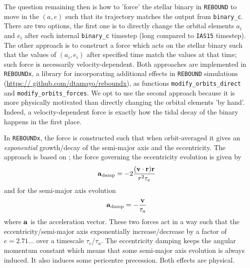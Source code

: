 \documentclass[twoside,openright,titlepage,numbers=noenddot,headinclude,%
                footinclude=true,cleardoublepage=empty,abstractoff, 
                BCOR=5mm,paper=a4,fontsize=11pt,%
                american,%
                ]{scrreprt}%
\begin{document}
The question remaining then is how to 'force' the stellar binary in \texttt{REBOUND}
to move in the $(a,e)$ such that its trajectory matches the output from 
\texttt{binary\_c}. There are two options, the first one is to directly change 
the orbital elements $a_i$ and $e_i$ after each internal \texttt{binary\_c} timestep
(long compared to \texttt{IAS15} timestep). The other approach is to construct 
a force which acts on the stellar binary such that the values of $(a_i,e_i)$ after
specified time match the  values at that time; such force is 
necessarily velocity-dependent. Both approaches
are implemented in \texttt{REBOUNDx}, a library for incorporating additional effects
in \texttt{REBOUND} simulations (\url{https:// github.com/dtamayo/reboundx}), as
functions \texttt{modify\_orbits\_direct} and \texttt{modify\_orbits\_forces}. We opt
to use the second approach because it is more physically motivated than directly 
changing the orbital elements 'by hand'. Indeed, a velocity-dependent force
 is exactly how the tidal decay of the binary happens in the first place.

In \texttt{REBOUNDx}, the force is constructed such that when orbit-averaged it
gives an \emph{exponential} growth/decay of the semi-major axis and the
eccentricity. The approach is based on \citet{papaloizou}; the force governing 
the eccentricity evolution is given by
\begin{equation}
    \boldsymbol{\mathbf{a}}_\text{damp}=-2 \frac{(\boldsymbol{\mathbf{v}}\cdot\boldsymbol{\mathbf{r}})\boldsymbol{\mathbf{r}}}{r^2 \tau_e }
\end{equation}
and for the semi-major axis evolution
\begin{equation}
    \boldsymbol{\mathbf{a}}_\text{damp}=- \frac{\boldsymbol{\mathbf{v}}}{\tau_a} 
\end{equation}
where $\boldsymbol{\mathbf{a}}$ is the acceleration vector. These two forces act in a way such
that the eccentricity/semi-major axis exponentially increase/decrease by a factor
of $e=2.71\dots$ over a timescale $\tau_e$/$\tau_a$. The eccentricity damping
keeps the angular momentum constant which means that some semi-major axis 
evolution is always induced. It also induces some pericentre precession. Both
effects are physical. 
\end{document}
